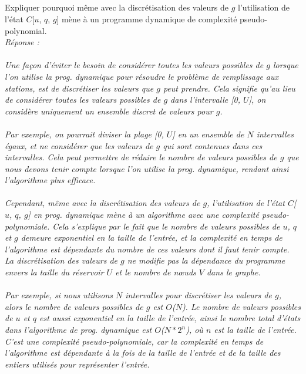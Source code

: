 \documentclass[a4paper,11pt]{article}
\begin{document}
	\subsection{}\label{subsec:Q7}
        Expliquer pourquoi même avec la discrétisation des valeurs de $g$ l’utilisation de l’état $C$[$u$, $q$, $g$] mène à un programme dynamique de complexité pseudo-polynomial.	
            \\\textit{Réponse : \\\\     
Une façon d'éviter le besoin de considérer toutes les valeurs possibles de $g$ lorsque l'on utilise la prog. dynamique pour résoudre le problème de remplissage aux stations, est de discrétiser les valeurs que $g$ peut prendre. Cela signifie qu'au lieu de considérer toutes les valeurs possibles de $g$ dans l'intervalle [0, $U$], on considère uniquement un ensemble discret de valeurs pour $g$.\\\\
Par exemple, on pourrait diviser la plage [0, $U$]  en un ensemble de $N$ intervalles égaux, et ne considérer que les valeurs de $g$ qui sont contenues dans ces intervalles. Cela peut permettre de réduire le nombre de valeurs possibles de $g$ que nous devons tenir compte lorsque l'on utilise la prog. dynamique, rendant ainsi l'algorithme plus efficace.\\\\
Cependant, même avec la discrétisation des valeurs de $g$, l'utilisation de l'état $C$[$u$, $q$, $g$] en prog. dynamique mène à un algorithme avec une complexité pseudo-polynomiale. Cela s'explique par le fait que le nombre de valeurs possibles de $u$, $q$ et $g$ demeure exponentiel en la taille de l'entrée, et la complexité en temps de l'algorithme est dépendante du nombre de ces valeurs dont il faut tenir compte. La discrétisation des valeurs de $g$ ne modifie pas la dépendance du programme envers la taille du réservoir $U$ et le nombre de nœuds $V$ dans le graphe.\\\\
Par exemple, si nous utilisons $N$ intervalles pour discrétiser les valeurs de $g$, alors le nombre de valeurs possibles de $g$ est $O$($N$). Le nombre de valeurs possibles de $u$ et $q$ est aussi exponentiel en la taille de l'entrée, ainsi le nombre total d'états dans l'algorithme de prog. dynamique est $O$($N*{2^{n}}$), où $n$ est la taille de l'entrée. C'est une complexité pseudo-polynomiale, car la complexité en temps de l'algorithme est dépendante à la fois de la taille de l'entrée et de la taille des entiers utilisés pour représenter l'entrée.\\\\}
\end{document}
